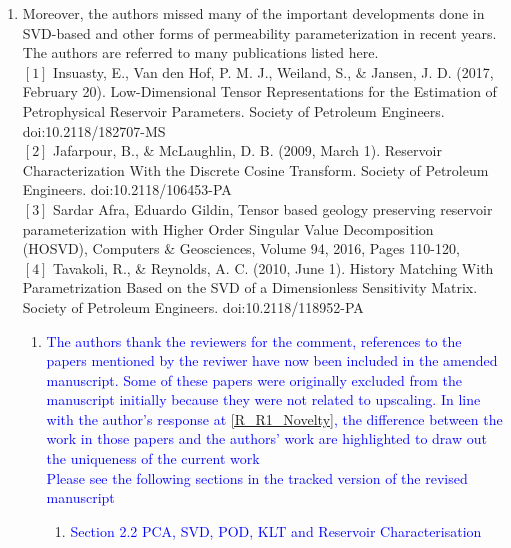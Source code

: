 \documentclass[11pt]{letter} %
\newcommand{\blue}{\textcolor{blue}}
\begin{document}
\begin{letter}
{\begin{enumerate}
\begin{enumerate}
\begin{enumerate}
\begin{enumerate}
 \item \blue{5.1.4. 3-D PCA (i.e., using HOSVD) \& LinReg Case Pre-processing Algorithm}
\item \blue{Figure 11 to 13}
\item \blue{Appendix B}
   \end{enumerate}
        \end{enumerate}
    \item \label{R_R1_MissedNewDev}Moreover, the authors missed many of the important developments done in SVD-based and other forms of permeability  parameterization in recent years. The authors are referred to many publications listed here.\\
$[1]$ Insuasty, E., Van den Hof, P. M. J., Weiland, S., \& Jansen, J. D. (2017, February 20). Low-Dimensional Tensor Representations for the Estimation of Petrophysical Reservoir Parameters. Society of Petroleum Engineers. doi:10.2118/182707-MS\\
$[2]$ Jafarpour, B., \& McLaughlin, D. B. (2009, March 1). Reservoir Characterization With the Discrete Cosine Transform. Society of Petroleum Engineers. doi:10.2118/106453-PA\\
$[3]$ Sardar Afra, Eduardo Gildin, Tensor based geology preserving reservoir parameterization with Higher Order Singular Value Decomposition (HOSVD), Computers \& Geosciences, Volume 94, 2016, Pages 110-120,\\
      $[4]$  Tavakoli, R., \& Reynolds, A. C. (2010, June 1). History Matching With Parametrization Based on the SVD of a Dimensionless Sensitivity Matrix. Society of Petroleum Engineers. doi:10.2118/118952-PA
      \begin{enumerate}
      \item \label{R_R1_MissedNewDev_P1} \blue{The authors thank the reviewers for the comment, references to the papers mentioned by the reviwer have now been included in the amended manuscript. Some of these papers were originally excluded from the manuscript initially because they were not related to upscaling. In line with the author's response at \ref{R_R1_Novelty}, the difference between the work in those papers and the authors' work are highlighted to draw out the uniqueness of the current work}\\
        \blue{Please see the following sections in the tracked version of the revised manuscript}
   \begin{enumerate}
\item \blue{Section 2.2 PCA, SVD, POD, KLT and Reservoir Characterisation}

\end{enumerate}
\end{enumerate}
\end{enumerate}
\end{enumerate}}
\end{letter}
\end{document}
